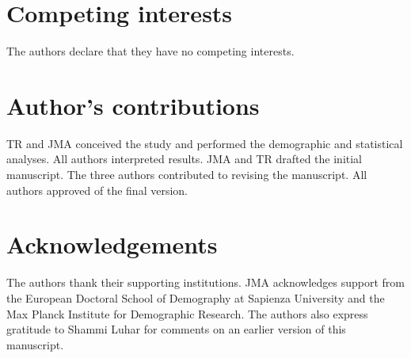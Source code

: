 \documentclass{bmcart}
\begin{document}
\begin{backmatter}

\section*{Competing interests}
  The authors declare that they have no competing interests.

\section*{Author's contributions}
TR and JMA conceived the study and performed the demographic and statistical analyses. All authors interpreted results. JMA and TR drafted the initial manuscript. The three authors contributed to revising the manuscript. All authors approved of the final version.
 
\section*{Acknowledgements}
The authors thank their supporting institutions. JMA acknowledges support from the European Doctoral School of Demography at Sapienza University and the Max Planck Institute for Demographic Research. The authors also express gratitude to Shammi Luhar for comments on an earlier version of this manuscript.



\end{backmatter}
\end{document}
